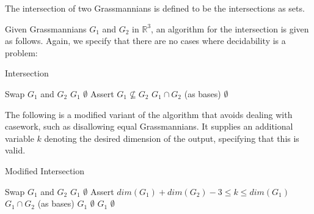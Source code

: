 \documentclass[12pt]{article}
\newcommand{\R}{\mathbb{R}}
\newenvironment{definition}[2][Definition]{\begin{trivlist}
\item[\hskip \labelsep {\bfseries #1}\hskip \labelsep {\bfseries #2.}]}{\end{trivlist}}
\newenvironment{proposition}[2][Proposition]{\begin{trivlist}
\item[\hskip \labelsep {\bfseries #1}\hskip \labelsep {\bfseries #2.}]}{\end{trivlist}}
\begin{document}
\begin{definition}{3.1}
The intersection of two Grassmannians is defined to be the intersections as sets.
\end{definition}

\begin{proposition}{3.2}
Given Grassmannians \(G_1\) and \(G_2\) in \(\R^3\), an algorithm for the intersection is given as follows. Again, we specify that there are no cases where decidability is a problem:

\begin{algorithm}[H]
\caption{Intersection}
\begin{algorithmic}[3]
\State Swap $G_1$ and $G_2$
\EndIf
{}
\Return $G_1$
\Return $\emptyset$
\EndIf
\State Assert $G_1 \not\subseteq G_2$
\Return $G_1 \cap G_2$ (as bases)
\Return $\emptyset$
\Else{
\Return $\emptyset$
}
\EndIf
\EndProcedure
\end{algorithmic}
\end{algorithm}

\end{proposition}

\begin{proposition}{3.3}
The following is a modified variant of the algorithm that avoids dealing with casework, such as disallowing equal Grassmannians. It supplies an additional variable \(k\) denoting the desired dimension of the output, specifying that this is valid.

\begin{algorithm}[H]
\caption{Modified Intersection}
\begin{algorithmic}[4]
\State Swap $G_1$ and $G_2$
\EndIf
{}
\Return $G_1$
\Return $\emptyset$
\EndIf
\State Assert $dim(G_1) + dim(G_2) - 3 \leq k \leq dim(G_1)$
\Return $G_1 \cap G_2$ (as bases)
\Return $G_1$
\Return $\emptyset$
\Return $G_1$
\Return $\emptyset$
\EndIf
\EndProcedure
\end{algorithmic}
\end{algorithm}

\end{proposition}
\end{document}
